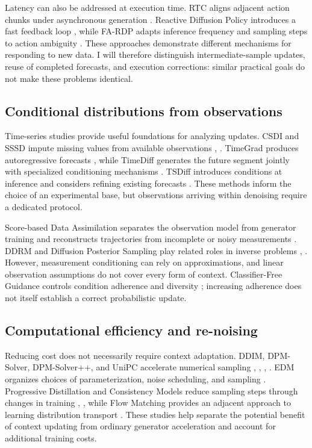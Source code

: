 \documentclass{article}
\begin{document}
Latency can also be addressed at execution time. RTC aligns adjacent action chunks under asynchronous generation \citep{p06}. Reactive Diffusion Policy introduces a fast feedback loop \citep{p07}, while FA-RDP adapts inference frequency and sampling steps to action ambiguity \citep{p08}. These approaches demonstrate different mechanisms for responding to new data. I will therefore distinguish intermediate-sample updates, reuse of completed forecasts, and execution corrections: similar practical goals do not make these problems identical.

\subsection{Conditional distributions from observations}

Time-series studies provide useful foundations for analyzing updates. CSDI and SSSD impute missing values from available observations \citep{p19}, \citep{p23}. TimeGrad produces autoregressive forecasts \citep{p20}, while TimeDiff generates the future segment jointly with specialized conditioning mechanisms \citep{p21}. TSDiff introduces conditions at inference and considers refining existing forecasts \citep{p24}. These methods inform the choice of an experimental base, but observations arriving within denoising require a dedicated protocol.

Score-based Data Assimilation separates the observation model from generator training and reconstructs trajectories from incomplete or noisy measurements \citep{p22}. DDRM and Diffusion Posterior Sampling play related roles in inverse problems \citep{p29}, \citep{p28}. However, measurement conditioning can rely on approximations, and linear observation assumptions do not cover every form of context. Classifier-Free Guidance controls condition adherence and diversity \citep{p40}; increasing adherence does not itself establish a correct probabilistic update.

\subsection{Computational efficiency and re-noising}

Reducing cost does not necessarily require context adaptation. DDIM, DPM-Solver, DPM-Solver++, and UniPC accelerate numerical sampling \citep{p30}, \citep{p31}, \citep{p32}, \citep{p33}. EDM organizes choices of parameterization, noise scheduling, and sampling \citep{p36}. Progressive Distillation and Consistency Models reduce sampling steps through changes in training \citep{p35}, \citep{p34}, while Flow Matching provides an adjacent approach to learning distribution transport \citep{p39}. These studies help separate the potential benefit of context updating from ordinary generator acceleration and account for additional training costs.
\end{document}
